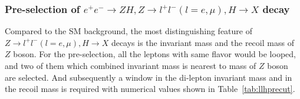 \documentclass[11pt,a4paper]{cepcnote}
\begin{document}
\subsubsection{Pre-selection of $e^+e^- \rightarrow ZH, Z\rightarrow l^+l^-(l=e,\mu), H\rightarrow X$ decay}
Compared to the SM background, the most distinguishing feature of 
$Z\rightarrow l^+l^-(l=e,\mu), H\rightarrow X$ decays is the invariant mass 
and the recoil mass of $Z$ boson. For the pre-selection, {\color{blue}all the leptons with same flavor would be looped, 
and two of them which combined invariant mass is nearest to mass of $Z$ boson are selected.} 
And subsequently a window in the di-lepton invariant mass and in the recoil mass
is required with numerical values shown in Table~\ref{tab:llhprecut}.
\begin{figure}[H]
	\centering
\end{figure}
\end{document}
